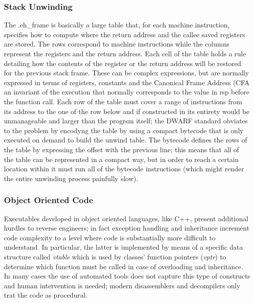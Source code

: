 \subsubsection{Stack Unwinding}
The {\ttfamily .eh\_frame} is basically a large table that, for each machine instruction, specifies how to compute where
the return address and the callee saved registers are stored. The rows correspond to machine instructions while the
columns represent the registers and the return address. Each cell of the table holds a rule detailing how the contents
of the register or the return address will be restored for the previous stack frame. These can be complex expressions,
but are normally expressed in terms of registers, constants and the Canonical Frame Address ({\ttfamily CFA} an
invariant of the execution that normally corresponds to the value in {\ttfamily rsp} before the function call. Each row
of the table must cover a range of instructions from its address to the one of the row below and if constructed in its
entirety would be unmanageable and larger than the progrsm itself; the DWARF standard obviates to the problem by
encodyng the table by using a compact bytecode that is only executed on demand to build the unwind table. The bytecode
defines the rows of the table by expressing the offset with the previous line; this means that all of the table can be
represented in a compact way, but in order to reach a certain location within it must run all of the bytecode
instructions (which might render the entire unwinding process painfully slow).

\subsubsection{Object Oriented Code}
Executables developed in object oriented languages, like C++, present additional hurdles to reverse engineers; in fact
exception handling and inheritance increment code complexity to a level where code is substantially more difficult to
understand. In particular, the latter is implemented by means of a specific data structure called \textit{vtable} which
is used by classes' function pointers (\textit{vptr}) to determine which function must be called in case of overloading
and inheritance. In many cases the use of automated tools does not capture this type of constructs and human
intervention is needed; modern disassemblers and decompilers only trat the code as procedural.


